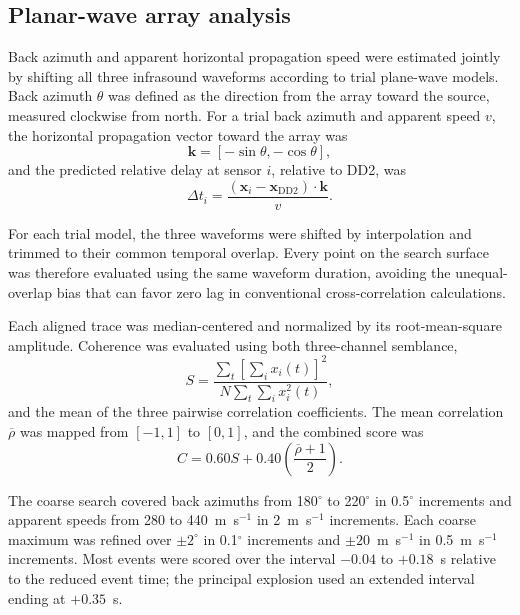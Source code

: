 \documentclass[]{seismica}
\begin{document}
\subsection{Planar-wave array analysis}

Back azimuth and apparent horizontal propagation speed were estimated jointly by shifting all three infrasound waveforms according to trial plane-wave models. Back azimuth $\theta$ was defined as the direction from the array toward the source, measured clockwise from north. For a trial back azimuth and apparent speed $v$, the horizontal propagation vector toward the array was
\begin{equation}
  \mathbf{k} = [-\sin\theta,-\cos\theta],
  \label{eq:propagation_vector}
\end{equation}
and the predicted relative delay at sensor $i$, relative to DD2, was
\begin{equation}
  \Delta t_i = \frac{(\mathbf{x}_i-\mathbf{x}_{\mathrm{DD2}})\cdot\mathbf{k}}{v}.
  \label{eq:plane_delay}
\end{equation}

For each trial model, the three waveforms were shifted by interpolation and trimmed to their common temporal overlap. Every point on the search surface was therefore evaluated using the same waveform duration, avoiding the unequal-overlap bias that can favor zero lag in conventional cross-correlation calculations.

Each aligned trace was median-centered and normalized by its root-mean-square amplitude. Coherence was evaluated using both three-channel semblance,
\begin{equation}
  S = \frac{\sum_t\left[\sum_i x_i(t)\right]^2}{N\sum_t\sum_i x_i^2(t)},
  \label{eq:semblance}
\end{equation}
and the mean of the three pairwise correlation coefficients. The mean correlation $\overline{\rho}$ was mapped from $[-1,1]$ to $[0,1]$, and the combined score was
\begin{equation}
  C = 0.60S + 0.40\left(\frac{\overline{\rho}+1}{2}\right).
  \label{eq:coherence_score}
\end{equation}

The coarse search covered back azimuths from 180$^\circ$ to 220$^\circ$ in 0.5$^\circ$ increments and apparent speeds from 280 to 440~m~s$^{-1}$ in 2~m~s$^{-1}$ increments. Each coarse maximum was refined over $\pm2^\circ$ in 0.1$^\circ$ increments and $\pm20$~m~s$^{-1}$ in 0.5~m~s$^{-1}$ increments. Most events were scored over the interval $-0.04$ to $+0.18$~s relative to the reduced event time; the principal explosion used an extended interval ending at $+0.35$~s.
\end{document}
